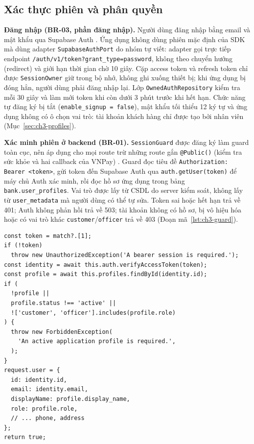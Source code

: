 \subsection{Xác thực phiên và phân quyền}
\label{sec:ch3-auth}

\textbf{Đăng nhập (BR-03, phần đăng nhập).} Người dùng đăng nhập bằng email và mật khẩu qua Supabase Auth \parencite{ch2-supabase-auth}. Ứng dụng không dùng phiên mặc định của SDK mà dùng adapter \texttt{Supabase\allowbreak{}Auth\allowbreak{}Port} do nhóm tự viết: adapter gọi trực tiếp endpoint \texttt{/\allowbreak{}auth/\allowbreak{}v1/\allowbreak{}token?grant\_\allowbreak{}type=password}, không theo chuyển hướng (redirect) và giới hạn thời gian chờ 10 giây. Cặp access token và refresh token chỉ được \texttt{SessionOwner} giữ trong bộ nhớ, không ghi xuống thiết bị; khi ứng dụng bị đóng hẳn, người dùng phải đăng nhập lại. Lớp \texttt{Owned\allowbreak{}Auth\allowbreak{}Repository} kiểm tra mỗi 30 giây và làm mới token khi còn dưới 3 phút trước khi hết hạn. Chức năng tự đăng ký bị tắt (\texttt{enable\_\allowbreak{}signup = false}), mật khẩu tối thiểu 12 ký tự và ứng dụng không có ô chọn vai trò: tài khoản khách hàng chỉ được tạo bởi nhân viên (Mục~\ref{sec:ch3-profiles}).

\textbf{Xác minh phiên ở backend (BR-01).} \texttt{SessionGuard} được đăng ký làm guard toàn cục, nên áp dụng cho mọi route trừ những route gắn \texttt{@Public()} (kiểm tra sức khỏe và hai callback của VNPay) \parencite{ch2-nestjs-guards}. Guard đọc tiêu đề \texttt{Authorization: Bearer <token>}, gửi token đến Supabase Auth qua \texttt{auth.\allowbreak{}getUser(token)} để máy chủ Auth xác minh, rồi đọc hồ sơ ứng dụng trong bảng \texttt{bank.\allowbreak{}user\_\allowbreak{}profiles}. Vai trò được lấy từ CSDL do server kiểm soát, không lấy từ \texttt{user\_\allowbreak{}metadata} mà người dùng có thể tự sửa. Token sai hoặc hết hạn trả về 401; Auth không phản hồi trả về 503; tài khoản không có hồ sơ, bị vô hiệu hóa hoặc có vai trò khác \texttt{customer}/\texttt{officer} trả về 403 (Đoạn mã~\ref{lst:ch3-guard}).

\begin{lstlisting}[caption={Phần cốt lõi của \texttt{SessionGuard} (\texttt{backend/\allowbreak{}src/\allowbreak{}auth/\allowbreak{}session.\allowbreak{}guard.\allowbreak{}ts}, rút gọn)},label={lst:ch3-guard}]
const token = match?.[1];
if (!token)
  throw new UnauthorizedException('A bearer session is required.');
const identity = await this.auth.verifyAccessToken(token);
const profile = await this.profiles.findById(identity.id);
if (
  !profile ||
  profile.status !== 'active' ||
  !['customer', 'officer'].includes(profile.role)
) {
  throw new ForbiddenException(
    'An active application profile is required.',
  );
}
request.user = {
  id: identity.id,
  email: identity.email,
  displayName: profile.display_name,
  role: profile.role,
  // ... phone, address
};
return true;
\end{lstlisting}

